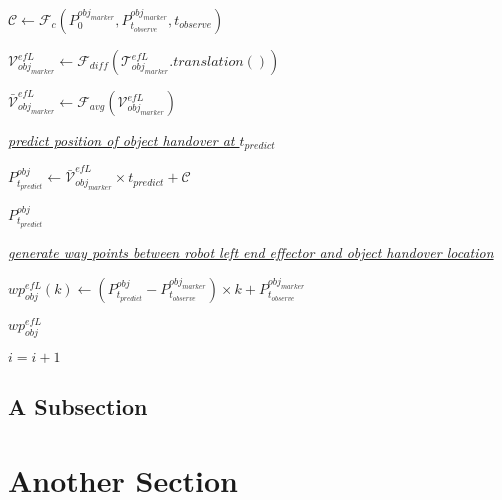 \begin{algorithm}[H]
\begin{algorithmic}[1]
		\State $\mathcal{C} \gets \mathcal{F}_c( P^{obj_{marker}}_0, P^{obj_{marker}}_{t_{observe}}, t_{observe} )$
		
		\State $\mathcal{V}^{efL}_{obj_{marker}} \gets \mathcal{F}_{diff}({\mathcal{T}^{efL}_{obj_{marker}}.translation()})$
		
		
		\State $\mathcal{\bar{V}}^{efL}_{obj_{marker}} \gets \mathcal{F}_{avg}(\mathcal{V}^{efL}_{obj_{marker}})$\newline
		
		
		\Statex \underline{\textit{predict position of object handover at $t_{predict}$}}
		
		\State $P^{obj}_{t_{predict}} \gets \mathcal{\bar{V}}^{efL}_{obj_{marker}}\times t_{predict}  + \mathcal{C}$ %
		
		\Return $P^{obj}_{t_{predict}}$
		
		\EndFunction\newline
		
		
		\Statex \underline{\textit{generate way points between robot left end effector and object handover location}}
		
		
		
		\State $wp^{efL}_{obj}(k) \gets (P^{obj}_{t_{predict}} - P^{obj_{marker}}_{t_{observe}}) \times k  +  P^{obj_{marker}}_{t_{observe}} $ 
		
		\EndFor
		
		\Return $wp^{efL}_{obj}$
		
		\EndFunction\newline
		
		\EndIf %
		
		\State $i = i + 1$
		
		\EndIf %
		
	\end{algorithmic}
	
\end{algorithm}


\subsection{A Subsection}


\section{Another Section}
